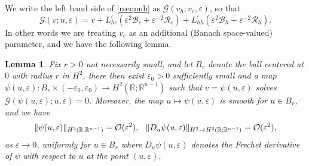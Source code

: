\documentclass[letterpaper,11pt]{article}
\newcommand{\R}{\mathbb{R}}
\newcommand{\rmO}{\mathcal{O}}
\newcommand{\eps}{\varepsilon}
\newcommand{\B}{\mathcal{B}}
\newcommand{\Rm}{\mathcal{R}}
\newcommand{\G}{\mathcal{G}}
\numberwithin{equation}{section}
\theoremstyle{plain}
\newtheorem{lemma}[theorem]{Lemma}
\theoremstyle{remark}
\begin{document}
We write the left hand side of \eqref{rseqnuh} as $\G(v_h; v_c,\eps)$, so that
\[
\G(v;u,\eps) = v+L_{hc}^{\eps}\left( \eps^2\B_c+\eps^{-2}\Rm_c \right)
+L_{hh}^{\eps}\left( \eps^2\B_h+\eps^{-2}\Rm_h \right). \]
In other words we are treating $v_c$ as an additional (Banach space-valued) parameter, and we have the following lemma.

\begin{lemma}\label{Lemuh} Fix $r>0$ not necessarily small, and let $B_r$ denote the ball centered at $0$ with radius $r$ in $H^2$, there then exist $\eps_0>0$ sufficiently small and a map $\psi(u,\eps): B_r \times (-\eps_0,\eps_0) \to H^2(\R;\R^{n-1})$ such that $v = \psi(u, \eps)$ solves $\G(\psi(u,\eps);u,\eps) = 0$. Moreover, the map $u \mapsto \psi(u,\eps)$ is smooth for $u\in B_r$, and we have 
\[
\|\psi(u,\eps)\|_{H^2(\R,\R^{n-1})} = \rmO(\eps^2), \hspace{0.1in}\|D_u\psi(u,\eps)\|_{H^2 \to H^2(\R;\R^{n-1})} = \rmO(\eps^2),
\] as 
$\eps \to 0$, uniformly for $u\in B_r$ where $D_u\psi(u,\eps)$ denotes the Frechet derivative of $\psi$ with respect to $u$ at the point $(u,\eps)$.  \end{lemma}
\end{document}
